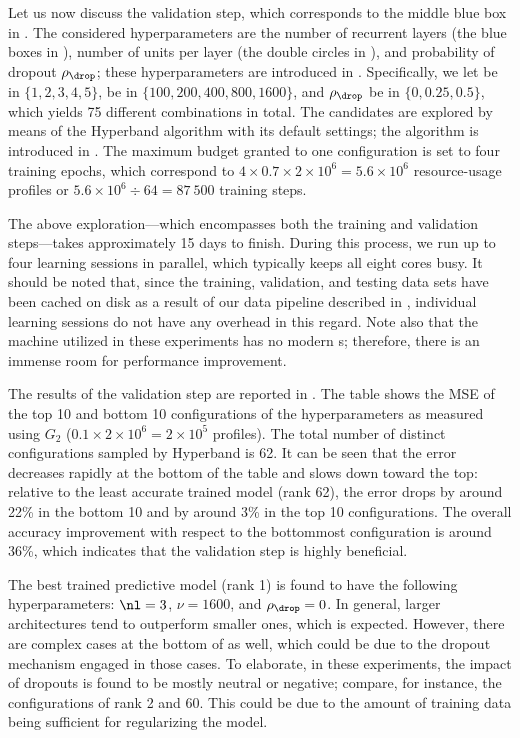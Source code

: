 Let us now discuss the validation step, which corresponds to the middle blue box
in . The considered hyperparameters are the number of
recurrent layers \nl (the blue boxes in ), number
of units per layer \nu (the double circles in ),
and probability of dropout $\rho_\drop$; these hyperparameters are introduced in
. Specifically, we let \nl be in $\{ 1, 2, 3, 4, 5
\}$, \nu be in $\{ 100, 200, 400, 800, 1600 \}$, and $\rho_\drop$ be in $\{ 0,
0.25, 0.5 \}$, which yields 75 different combinations in total. The candidates
are explored by means of the Hyperband algorithm with its default settings; the
algorithm is introduced in . The maximum budget
granted to one configuration is set to four training epochs, which correspond to
$4 \times 0.7 \times 2 \times 10^6 = 5.6 \times 10^6$ resource-usage profiles or
$5.6 \times 10^6 \div 64 = 87~500$ training steps.

The above exploration---which encompasses both the training and validation
steps---takes approximately 15 days to finish. During this process, we run up to
four learning sessions in parallel, which typically keeps all eight cores busy.
It should be noted that, since the training, validation, and testing data sets
have been cached on disk as a result of our data pipeline described in
, individual learning sessions do not have any
overhead in this regard. Note also that the machine utilized in these
experiments has no modern s; therefore, there is an immense room for
performance improvement.

The results of the validation step are reported in . The
table shows the \ac{MSE} of the top 10 and bottom 10 configurations of the
hyperparameters as measured using $G_2$ ($0.1 \times 2 \times 10^6 = 2 \times
10^5$ profiles). The total number of distinct configurations sampled by
Hyperband is 62. It can be seen that the error decreases rapidly at the bottom
of the table and slows down toward the top: relative to the least accurate
trained model (rank 62), the error drops by around 22\% in the bottom 10 and by
around 3\% in the top 10 configurations. The overall accuracy improvement with
respect to the bottommost configuration is around 36\%, which indicates that the
validation step is highly beneficial.

The best trained predictive model (rank 1) is found to have the following
hyperparameters: $\nl = 3$, $\nu = 1600$, and $\rho_\drop = 0$. In general,
larger architectures tend to outperform smaller ones, which is expected.
However, there are complex cases at the bottom of  as
well, which could be due to the dropout mechanism engaged in those cases. To
elaborate, in these experiments, the impact of dropouts is found to be mostly
neutral or negative; compare, for instance, the configurations of rank 2 and 60.
This could be due to the amount of training data being sufficient for
regularizing the model.

